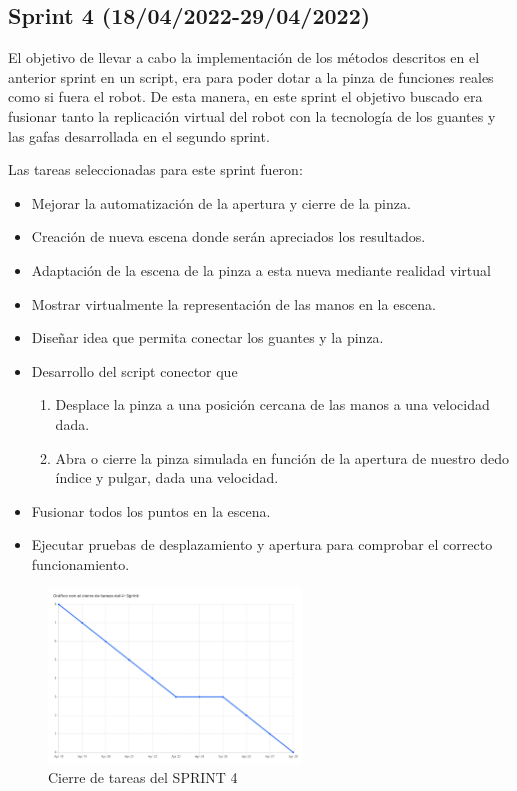 \subsection{\textbf{Sprint 4 (18/04/2022-29/04/2022)}}
El objetivo de llevar a cabo la implementación de los métodos descritos en el anterior sprint en un script, era para poder dotar a la pinza de funciones reales como si fuera el robot. De esta manera, en este sprint el objetivo buscado era fusionar tanto la replicación virtual del robot con la tecnología de los guantes y las gafas desarrollada en el segundo sprint.

Las tareas seleccionadas para este sprint fueron:
\begin{itemize}
    \item Mejorar la automatización de la apertura y cierre de la pinza.
    \item Creación de nueva escena donde serán apreciados los resultados.
    \item Adaptación de la escena de la pinza a esta nueva mediante realidad virtual\cite{VR}
    \item Mostrar virtualmente la representación de las manos en la escena.
    \item Diseñar idea que permita conectar los guantes y la pinza.
    \item Desarrollo del script conector que \begin{enumerate}
        \item Desplace la pinza a una posición cercana de las manos a una velocidad dada.
        \item Abra o cierre la pinza simulada en función de la apertura de nuestro dedo índice y pulgar, dada una velocidad.
    \end{enumerate}
    \item Fusionar todos los puntos en la escena.
    \item Ejecutar pruebas de desplazamiento y apertura para comprobar el correcto funcionamiento.
\end{itemize}

\begin{figure}[h]
\centering
\label{Cierre de tareas del SPRINT 4}
\includegraphics[width=0.6\textwidth]{img/sprint4.PNG}
\caption{Cierre de tareas del SPRINT 4}
\end{figure}
